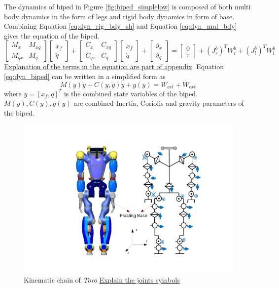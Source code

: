 The dynamics of biped in Figure \ref{fig:biped_simplelow} is composed of both multi body dynamics in the form of legs and rigid body dynamics in form of base. Combining Equation \ref{eq:dyn_rig_bdy_sh} and Equation \ref{eq:dyn_mul_bdy} gives the equation of the biped.
\begin{equation} \label{eq:dyn_biped}
\begin{bmatrix}
M_x &M_{xq} \\ M_{qx} &M_q
\end{bmatrix}
\begin{bmatrix}
\ddot{x}_f \\ \ddot{q}
\end{bmatrix}
+
\begin{bmatrix}
C_x &C_{xq} \\ C_{qx} &C_q
\end{bmatrix}
\begin{bmatrix}
\dot{x}_f \\ \dot{q}
\end{bmatrix}
+
\begin{bmatrix}
g_x \\ g_q
\end{bmatrix}
=
\begin{bmatrix}
0 \\ \tau
\end{bmatrix}
+ (J_r^b)^T W_r^b + (J_l^b)^T W_l^b
\end{equation}
\underline{Explanation of the terms in the equation are part of appendix}.
Equation \ref{eq:dyn_biped} can be written in a simplified form as
\begin{equation} \label{eq:dyn_sbiped}
M(y)\ddot{y} + C(y,\dot{y})\dot{y} + g(y) = W_{act} + W_{ext}
\end{equation}
where $y = [x_f,q]^T$ is the combined state variables of the biped. $M(y),C(y),g(y)$ are combined Inertia, Coriolis and gravity parameters of the biped.
\begin{figure}
\begin{center}
\includegraphics[trim= 70mm 10mm 40mm 10mm,clip,scale=0.7]{Bilder/TORO_kinematic.pdf}
\caption{Kinematic chain of \emph{Toro} \underline{Explain the joints symbols}}
\label{fig:toro_kin}
\end{center}
\end{figure}


